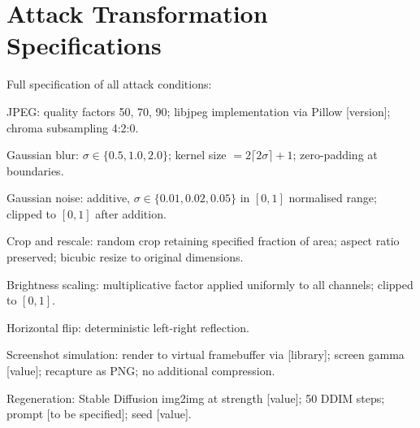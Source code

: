 ﻿\documentclass[12pt, a4paper, twoside]{report}
\numberwithin{equation}{chapter}
\begin{document}
\chapter{Attack Transformation Specifications}

Full specification of all attack conditions:

JPEG: quality factors 50, 70, 90; libjpeg implementation via Pillow [version]; chroma subsampling 4:2:0.

Gaussian blur: $\sigma \in \{0.5, 1.0, 2.0\}$; kernel size $= 2 \lceil 2\sigma \rceil + 1$; zero-padding at boundaries.

Gaussian noise: additive, $\sigma \in \{0.01, 0.02, 0.05\}$ in $[0,1]$ normalised range; clipped to $[0,1]$ after addition.

Crop and rescale: random crop retaining specified fraction of area; aspect ratio preserved; bicubic resize to original dimensions.

Brightness scaling: multiplicative factor applied uniformly to all channels; clipped to $[0,1]$.

Horizontal flip: deterministic left-right reflection.

Screenshot simulation: render to virtual framebuffer via [library]; screen gamma [value]; recapture as PNG; no additional compression.

Regeneration: Stable Diffusion img2img at strength [value]; 50 DDIM steps; prompt [to be specified]; seed [value].

\clearpage
\printbibliography
\end{document}
